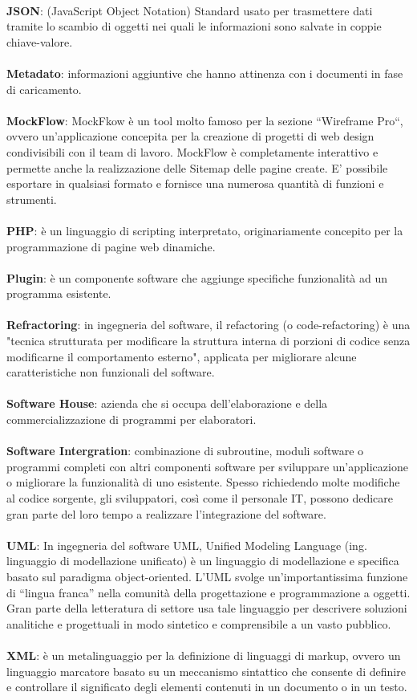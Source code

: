 \\
\textbf{JSON}: (JavaScript Object Notation) Standard usato per trasmettere dati tramite lo
scambio di oggetti nei quali le informazioni sono salvate in coppie chiave-valore.
\\
\\
\textbf{Metadato}:
informazioni aggiuntive che hanno attinenza con i documenti in fase di caricamento.
\\
\\
\textbf{MockFlow}:
MockFkow è un tool molto famoso per la sezione “Wireframe Pro“, ovvero un’applicazione concepita per la creazione di progetti di web design condivisibili con il team di lavoro. MockFlow è completamente interattivo e permette anche la realizzazione delle Sitemap delle pagine create. E’ possibile esportare in qualsiasi formato e fornisce una numerosa quantità di funzioni e strumenti.
\\
\\
\textbf{PHP}: è un linguaggio di scripting interpretato, originariamente concepito per la programmazione di pagine web dinamiche.
\\
\\
\textbf{Plugin}: è un componente software che aggiunge specifiche funzionalità ad un programma esistente.
\\
\\
\textbf{Refractoring}: in ingegneria del software, il refactoring (o code-refactoring) è una "tecnica strutturata per modificare la struttura interna di porzioni di codice senza modificarne il comportamento esterno", applicata per migliorare alcune caratteristiche non funzionali del software.
\\
\\
\textbf{Software House}: azienda che si occupa dell'elaborazione e della commercializzazione di programmi per elaboratori.
\\
\\
\textbf{Software Intergration}: combinazione di subroutine, moduli software o programmi completi con altri componenti software per sviluppare un'applicazione o migliorare la funzionalità di uno esistente. Spesso richiedendo molte modifiche al codice sorgente, gli sviluppatori, così come il personale IT, possono dedicare gran parte del loro tempo a realizzare l'integrazione del software.
\\
\\
\textbf{UML}: In ingegneria del software UML, Unified Modeling Language (ing. linguaggio di modellazione unificato) è un linguaggio di modellazione e specifica basato sul paradigma object-oriented. L’UML svolge un’importantissima funzione di “lingua franca” nella comunità della progettazione e programmazione a oggetti. Gran parte della letteratura di settore usa tale linguaggio per descrivere soluzioni analitiche e progettuali in modo sintetico e comprensibile a un vasto pubblico.
\\
\\
\textbf{XML}: è un metalinguaggio per la definizione di linguaggi di markup, ovvero un linguaggio marcatore basato su un meccanismo sintattico che consente di definire e controllare il significato degli elementi contenuti in un documento o in un testo.